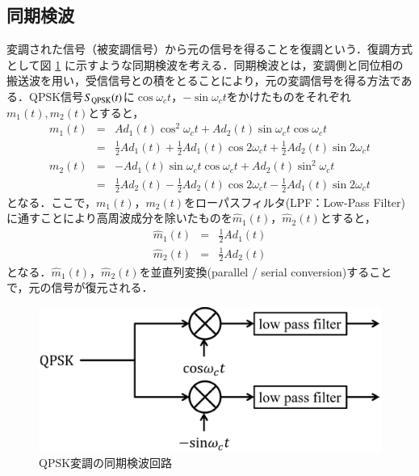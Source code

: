 \subsection{同期検波}
変調された信号（被変調信号）から元の信号を得ることを復調という．復調方式として図 \ref{fig:qpskcoh} に示すような同期検波を考える．同期検波とは，変調側と同位相の搬送波を用い，受信信号との積をとることにより，元の変調信号を得る方法である\cite{takahata}．QPSK信号$S_{{\rm QPSK}}(t)$に$\cos\omega_c t$，$-\sin\omega_c t$をかけたものをそれぞれ$m_1(t), m_2(t)$とすると，
\begin{eqnarray}
m_1(t)&=&Ad_1(t)\cos^2\omega_ct+Ad_2(t)\sin\omega_ct\cos\omega_ct \nonumber \\
&=&\frac{1}{2}Ad_1(t)+\frac{1}{2}Ad_1(t)\cos2\omega_ct+\frac{1}{2}Ad_2(t)\sin2\omega_ct \\
m_2(t)&=&-Ad_1(t)\sin\omega_ct\cos\omega_ct+Ad_2(t)\sin^2\omega_ct \nonumber \\
&=&\frac{1}{2}Ad_2(t)-\frac{1}{2}Ad_2(t)\cos2\omega_ct-\frac{1}{2}Ad_1(t)\sin2\omega_ct
\end{eqnarray}
となる．ここで，$m_1(t)$，$m_2(t)$をローパスフィルタ(LPF：Low-Pass Filter)に通すことにより高周波成分を除いたものを$\hat{m}_1(t)$，$\hat{m}_2(t)$とすると，
\begin{eqnarray}
\hat{m}_1(t)&=&\frac{1}{2}Ad_1(t)\\
\hat{m}_2(t)&=&\frac{1}{2}Ad_2(t)
\end{eqnarray}
となる．$\hat{m}_1(t)$，$\hat{m}_2(t)$を並直列変換(parallel / serial conversion)することで，元の信号が復元される．
\begin{figure}[t]
  \begin{center}
    \includegraphics[scale = 0.25]{./chapter2/figure/douki.eps}
    \caption{QPSK変調の同期検波回路}
    \label{fig:qpskcoh}
  \end{center}
\end{figure}

